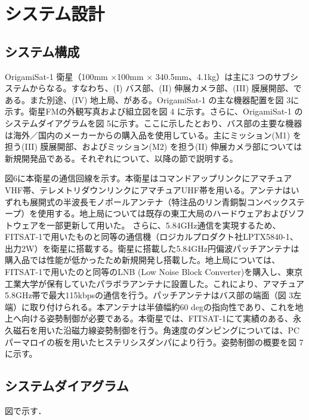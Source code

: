 \section{システム設計}

\subsection{システム構成}
OrigamiSat-1 衛星（100mm ×100mm × 340.5mm、4.1kg）は主に3 つのサブシステムからなる。すなわち、(I) バス部、(II) 伸展カメラ部、(III) 膜展開部、である。また別途、(IV) 地上局、がある。OrigamiSat-1 の主な機器配置を図 3に示す。衛星FMの外観写真および組立図を図 4 に示す。さらに、OrigamiSat-1 のシステムダイアグラムを図 5に示す。ここに示したとおり、バス部の主要な機器は海外／国内のメーカーからの購入品を使用している。主にミッション(M1) を担う(III) 膜展開部、およびミッション(M2) を担う(II) 伸展カメラ部については新規開発品である。それぞれについて、以降の節で説明する。

図6に本衛星の通信回線を示す。本衛星はコマンドアップリンクにアマチュアVHF帯、テレメトリダウンリンクにアマチュアUHF帯を用いる。アンテナはいずれも展開式の半波長モノポールアンテナ（特注品のリン青銅製コンベックステープ）を使用する。地上局については既存の東工大局のハードウェアおよびソフトウェアを一部更新して用いた。
さらに、5.84GHz通信を実現するため、FITSAT-1で用いたものと同等の通信機（ロジカルプロダクト社LPTX5840-1、出力2W）を衛星に搭載する。衛星に搭載した5.84GHz円偏波パッチアンテナは購入品では性能が低かったため新規開発し搭載した。地上局については、FITSAT-1で用いたのと同等のLNB (Low Noise Block Converter)を購入し、東京工業大学が保有していたパラボラアンテナに設置した。これにより、アマチュア5.8GHz帯で最大115kbpsの通信を行う。パッチアンテナはバス部の端面（図 3左端）に取り付けられる。本アンテナは半値幅約60 degの指向性であり、これを地上へ向ける姿勢制御が必要である。本衛星では、FITSAT-1にて実績のある、永久磁石を用いた沿磁力線姿勢制御を行う。角速度のダンピングについては、PCパーマロイの板を用いたヒステリシスダンパにより行う。姿勢制御の概要を図 7に示す。

\subsection{システムダイアグラム}
図で示す．